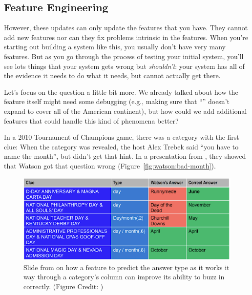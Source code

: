 \subsection{Feature Engineering}
\label{sec:watson:feature-engineering}

However, these updates can only update the features that you have.
%
They cannot add new features nor can they fix problems intrinsic in the
features.
%
When you're starting out building a system like this, you usually
don't have very many features.
%
But as you go through the process of testing your initial system, you'll see
lots things that your system gets wrong but \emph{shouldn't}: your system has
all of the evidence it needs to do what it needs, but cannot actually get
there.

Let's focus on the  question a little bit more.
%
We already talked about how the feature itself might need some debugging
(e.g., making sure that ``'' doesn't expand to cover all of the
American continent), but how could we add additional features that could
handle this kind of phenomena better?

In a 2010 Tournament of Champions game, there was a category with the first clue:
%
%
When the category was revealed, the host Alex Trebek said ``you have to name
the month'', but \watson{} didn't get that hint.
%
In a presentation from , they showed that Watson got that question
wrong (Figure~\ref{fig:watson:bad-month}).

\begin{figure}
  \includegraphics[width=0.8\linewidth]{figures/external/ibm_watson_feature}
  \caption{Slide from  \watson{} on how a feature to predict the
    answer type as it works it way through a category's column can improve its
    ability to buzz in correctly.  (Figure Credit: )}
\end{figure}


